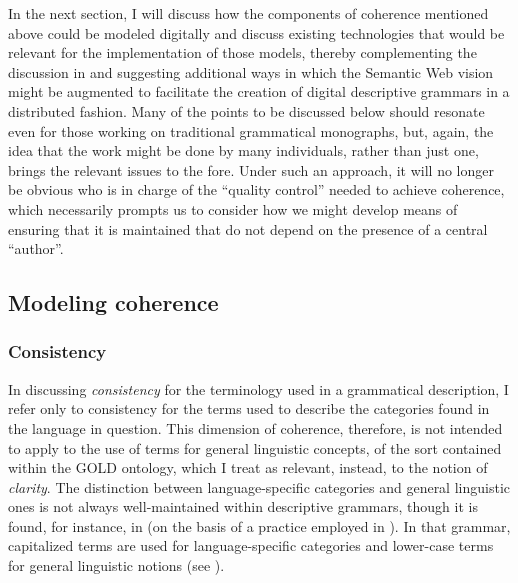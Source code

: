 In the next section, I will discuss how the components of coherence mentioned above could be modeled digitally and discuss existing
technologies that would be relevant for the implementation of those models,
thereby complementing the discussion in  and suggesting
additional ways in which the Semantic Web vision might be augmented to
facilitate the creation of digital descriptive grammars in a distributed
fashion. Many of the points to be discussed below should resonate even for those
working on traditional grammatical monographs, but, again, the idea that the
work might be done by many individuals, rather than just one, brings the
relevant issues to the fore. Under such an approach, it will no longer be
obvious who is in charge of the ``quality control'' needed to achieve
coherence, which necessarily prompts us to consider how we might develop means
of ensuring that it is maintained that do not depend on the presence of a
central ``author''.



\subsection{Modeling coherence\label{ModelingCoherence}}

\subsubsection{Consistency\label{ConsistencySec}}

In discussing \emph{consistency} for the terminology used in a grammatical
description, I refer only to consistency for the terms used to describe the
categories found in the language in question. This dimension of coherence,
therefore, is not intended to apply to the use of terms for general linguistic
concepts, of the sort contained within the GOLD ontology, which I treat as
relevant, instead, to the notion of \emph{clarity}.
The distinction between language-specific categories and general linguistic ones
is not always well-maintained within descriptive grammars, though it is found,
for instance, in  (on the basis of a
practice employed in ). In that grammar, capitalized
terms are used for language-specific categories and lower-case terms for general
linguistic notions (see ).

